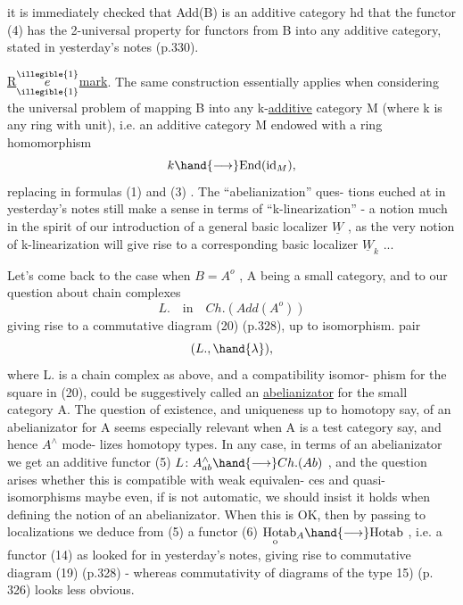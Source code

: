 
it is immediately checked that Add(B) is an additive category hd that
the functor (4) has the 2-universal property for functors from B into
any additive category, stated in yesterday's notes (p.330).

\uline{R$\overset{\illegible{1}}{\underset{\illegible{1}}{e}}$mark}. The same construction essentially applies when considering the
universal problem of mapping B into any k-\uline{additive} category M  (where
k is any  ring with unit), i.e. an additive category M endowed with a
ring homomorphism
\[ k \hand{\longrightarrow} \mathrm{End}(\mathrm{id}_M) , \]
replacing  in formulas (1) and (3) . The ``abelianization'' ques-%
tions euched at in yesterday's notes still make a sense in terms of
``k-linearization'' - a notion much in the spirit of our introduction
of a general basic localizer $\underline{W}$ , as the very notion of k-linearization
will give rise to a corresponding basic localizer $\underline{W}_k$ ...

Let's come back to the case when $B=A^o$ , A being a small category,
and to our question about chain complexes
\[ L. \quad \text{in} \quad Ch.(Add(A^o)) \]
giving rise to a commutative diagram (20) (p.328), up to isomorphism.
 pair
\[ (L. , \hand{\lambda}) , \]
where L. is a chain complex as above, and \hand{$\lambda$} a compatibility isomor-%
phism for the square in (20), could be suggestively called an
\uline{abelianizator} for the small category A. The question of existence,
and uniqueness up to homotopy say, of an abelianizator for A seems
especially relevant when A is a test category say, and hence $A^\wedge$ mode-%
lizes homotopy types. In any case, in terms of an abelianizator we
get an additive functor
(5) \qquad $L\colon A^\wedge_{ab} \hand{\longrightarrow} Ch.(Ab)$ ,
and the question arises whether this is compatible with weak equivalen-%
ces and quasi-isomorphisms\hand{;} \xout{-} maybe even, if  is not automatic, we
should insist it  holds when defining the notion of an abelianizator.
When this is OK, then by passing to localizations we deduce from (5)
a functor
(6) \qquad $\mathrm{H}\underset{\mathrm{o}}{\mathrm{o}}\mathrm{tab}_A \hand{\longrightarrow} \mathrm{Hotab}$ , \margin{\unsure{,}}
i.e. a functor (14) as looked for in yesterday's notes, giving rise
to  commutative diagram (19) (p.328) - whereas commutativity of
diagrams of the type 15) (p. 326) looks less obvious.


